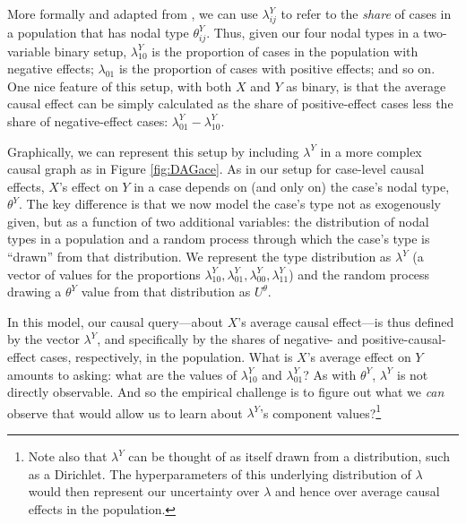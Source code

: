 \documentclass[
  12pt,
]{book}
\begin{document}
More formally and adapted from \citet{humphreys2015mixing}, we can use \(\lambda^Y_{ij}\) to refer to the \emph{share} of cases in a population that has nodal type \(\theta^Y_{ij}\). Thus, given our four nodal types in a two-variable binary setup, \(\lambda^Y_{10}\) is the proportion of cases in the population with negative effects; \(\lambda_{01}\) is the proportion of cases with positive effects; and so on. One nice feature of this setup, with both \(X\) and \(Y\) as binary, is that the average causal effect can be simply calculated as the share of positive-effect cases less the share of negative-effect cases: \(\lambda^Y_{01} - \lambda^Y_{10}\).

Graphically, we can represent this setup by including \(\lambda^Y\) in a more complex causal graph as in Figure \ref{fig:DAGace}. As in our setup for case-level causal effects, \(X\)'s effect on \(Y\) in a case depends on (and only on) the case's nodal type, \(\theta^Y\). The key difference is that we now model the case's type not as exogenously given, but as a function of two additional variables: the distribution of nodal types in a population and a random process through which the case's type is ``drawn'' from that distribution. We represent the type distribution as \(\lambda^Y\) (a vector of values for the proportions \(\lambda^Y_{10}, \lambda^Y_{01}, \lambda^Y_{00}, \lambda^Y_{11}\)) and the random process drawing a \(\theta^Y\) value from that distribution as \(U^\theta\).

In this model, our causal query---about \(X\)'s average causal effect---is thus defined by the vector \(\lambda^Y\), and specifically by the shares of negative- and positive-causal-effect cases, respectively, in the population. What is \(X\)'s average effect on \(Y\) amounts to asking: what are the values of \(\lambda^Y_{10}\) and \(\lambda^Y_{01}\)? As with \(\theta^Y\), \(\lambda^Y\) is not directly observable. And so the empirical challenge is to figure out what we \emph{can} observe that would allow us to learn about \(\lambda^Y\)'s component values?\footnote{Note also that \(\lambda^Y\) can be thought of as itself drawn from a distribution, such as a Dirichlet. The hyperparameters of this underlying distribution of \(\lambda\) would then represent our uncertainty over \(\lambda\) and hence over average causal effects in the population.}
\end{document}
